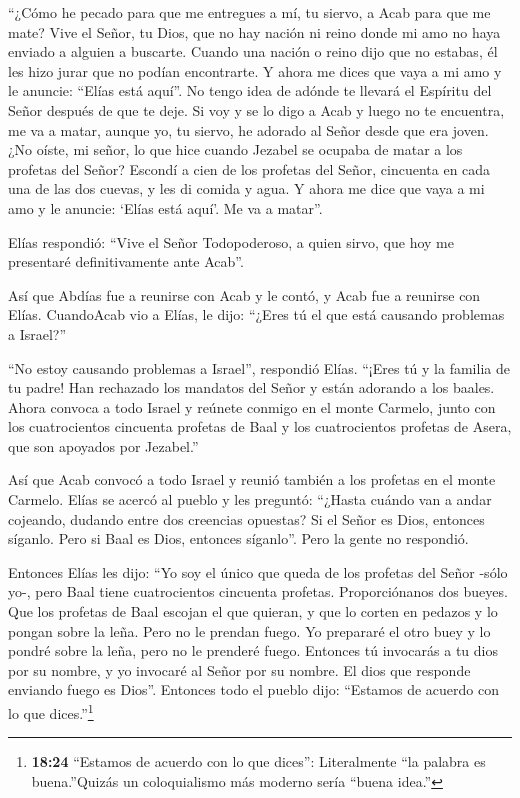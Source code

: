  ``¿Cómo he pecado para que me entregues a mí, tu siervo, a
Acab para que me mate?  Vive el Señor, tu Dios, que no hay
nación ni reino donde mi amo no haya enviado a alguien a buscarte.
Cuando una nación o reino dijo que no estabas, él les hizo jurar que no
podían encontrarte.  Y ahora me dices que vaya a mi amo y
le anuncie: ``Elías está aquí''.  No tengo idea de adónde
te llevará el Espíritu del Señor después de que te deje. Si voy y se lo
digo a Acab y luego no te encuentra, me va a matar, aunque yo, tu
siervo, he adorado al Señor desde que era joven.  ¿No
oíste, mi señor, lo que hice cuando Jezabel se ocupaba de matar a los
profetas del Señor? Escondí a cien de los profetas del Señor, cincuenta
en cada una de las dos cuevas, y les di comida y agua.  Y
ahora me dice que vaya a mi amo y le anuncie: `Elías está aquí'. Me va a
matar''.

 Elías respondió: ``Vive el Señor Todopoderoso, a quien
sirvo, que hoy me presentaré definitivamente ante Acab''.

 Así que Abdías fue a reunirse con Acab y le contó, y Acab
fue a reunirse con Elías.  CuandoAcab vio a Elías, le dijo:
``¿Eres tú el que está causando problemas a Israel?''

 ``No estoy causando problemas a Israel'', respondió Elías.
``¡Eres tú y la familia de tu padre! Han rechazado los mandatos del
Señor y están adorando a los baales.  Ahora convoca a todo
Israel y reúnete conmigo en el monte Carmelo, junto con los
cuatrocientos cincuenta profetas de Baal y los cuatrocientos profetas de
Asera, que son apoyados por Jezabel.''

 Así que Acab convocó a todo Israel y reunió también a los
profetas en el monte Carmelo.  Elías se acercó al pueblo y
les preguntó: ``¿Hasta cuándo van a andar cojeando, dudando entre dos
creencias opuestas? Si el Señor es Dios, entonces síganlo. Pero si Baal
es Dios, entonces síganlo''. Pero la gente no respondió.

 Entonces Elías les dijo: ``Yo soy el único que queda de
los profetas del Señor -sólo yo-, pero Baal tiene cuatrocientos
cincuenta profetas.  Proporciónanos dos bueyes. Que los
profetas de Baal escojan el que quieran, y que lo corten en pedazos y lo
pongan sobre la leña. Pero no le prendan fuego. Yo prepararé el otro
buey y lo pondré sobre la leña, pero no le prenderé fuego. 
Entonces tú invocarás a tu dios por su nombre, y yo invocaré al Señor
por su nombre. El dios que responde enviando fuego es Dios''. Entonces
todo el pueblo dijo: ``Estamos de acuerdo con lo que dices.''\footnote{\textbf{18:24}
  ``Estamos de acuerdo con lo que dices'': Literalmente ``la palabra es
  buena.''Quizás un coloquialismo más moderno sería ``buena idea.''}

